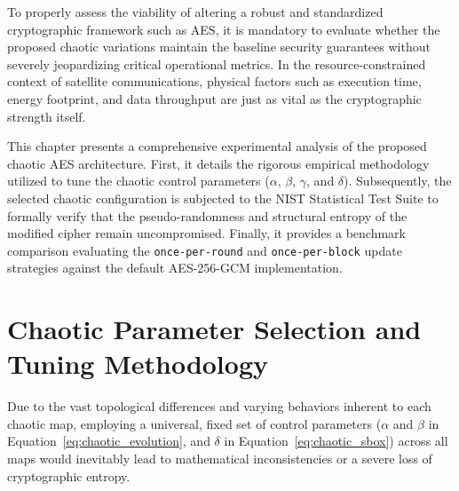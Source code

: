 \documentclass[11pt,a4paper]{report}
\begin{document}
To properly assess the viability of altering a robust and standardized cryptographic framework such as AES, 
it is mandatory to evaluate whether the proposed chaotic variations maintain the baseline security guarantees without severely jeopardizing critical operational metrics. 
In the resource-constrained context of satellite communications, physical factors such as execution time, energy footprint, and data throughput are just as vital as the cryptographic strength itself.

This chapter presents a comprehensive experimental analysis of the proposed chaotic AES architecture. 
First, it details the rigorous empirical methodology utilized to tune the chaotic control parameters ($\alpha$, $\beta$, $\gamma$, and $\delta$). 
Subsequently, the selected chaotic configuration is subjected to the NIST Statistical Test Suite to formally verify that the pseudo-randomness and structural entropy of the modified cipher remain uncompromised.
Finally, it provides a benchmark comparison evaluating the \texttt{once-per-round} and \texttt{once-per-block} update strategies against the default AES-256-GCM implementation.


\section{Chaotic Parameter Selection and Tuning Methodology}
Due to the vast topological differences and varying behaviors inherent to each chaotic map, employing a universal, fixed set of control parameters ($\alpha$ and $\beta$ in Equation~\ref{eq:chaotic_evolution}, and $\delta$ in Equation~\ref{eq:chaotic_sbox}) across all maps would inevitably lead to mathematical inconsistencies or a severe loss of cryptographic entropy.
\end{document}
